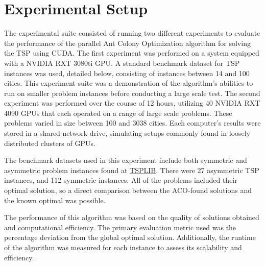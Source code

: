 \documentclass[11pt]{report}
\begin{document}
    \section{Experimental Setup}
    The experimental suite consisted of running two different experiments to evaluate the performance of the parallel Ant Colony Optimization algorithm for solving the TSP using CUDA. The first experiment was performed on a system equipped with a NVIDIA RXT 3080ti GPU. A standard benchmark dataset for TSP instances was used, detailed below, consisting of instances between 14 and 100 cities. This experiment suite was a demonstration of the algorithm's abilities to run on smaller problem instances before conducting a large scale test. The second experiment was performed over the course of 12 hours, utilizing 40 NVIDIA RXT 4090 GPUs that each operated on a range of large scale problems. These problems varied in size between 100 and 3038 cities. Each computer's results were stored in a shared network drive, simulating setups commonly found in loosely distributed clusters of GPUs.   
    
    The benchmark datasets used in this experiment include both symmetric and asymmetric problem instances found at \href{http://comopt.ifi.uni-heidelberg.de/software/TSPLIB95/}{TSPLIB}. There were 27 asymmetric TSP instances, and 112 symmetric instances. All of the problems included their optimal solution, so a direct comparison between the ACO-found solutions and the known optimal was possible. 
    
    The performance of this algorithm was based on the quality of solutions obtained and computational efficiency. The primary evaluation metric used was the percentage deviation from the global optimal solution. Additionally, the runtime of the algorithm was measured for each instance to assess its scalability and efficiency.
    
\end{document}
